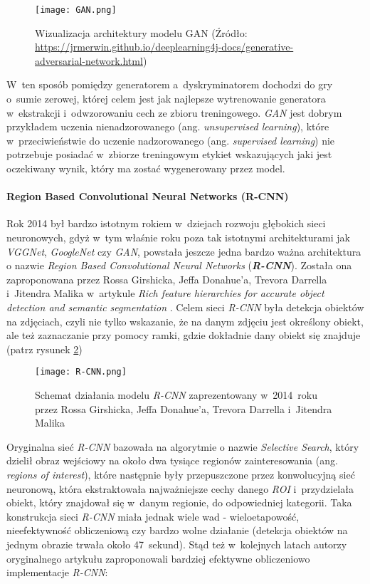 \begin{figure}[!h]
    \centering \texttt{[image: GAN.png]}
    \captionsetup{format=hang}
    \caption{Wizualizacja architektury modelu GAN (Źródło: \url{https://jrmerwin.github.io/deeplearning4j-docs/generative-adversarial-network.html})}
    \label{fig:gan1}
\end{figure}

W~ten sposób pomiędzy generatorem a~dyskryminatorem dochodzi do gry o~sumie zerowej, której celem jest jak najlepsze wytrenowanie generatora w~ekstrakcji i~odwzorowaniu cech ze zbioru treningowego. \emph{GAN} jest dobrym przykładem uczenia nienadzorowanego (ang. \emph{unsupervised learning}), które w~przeciwieństwie do uczenie nadzorowanego (ang. \emph{supervised learning}) nie potrzebuje posiadać w~zbiorze treningowym etykiet wskazujących jaki jest oczekiwany wynik, który ma zostać wygenerowany przez model. 

\paragraph*{Region Based Convolutional Neural Networks (R-CNN)}

Rok 2014 był bardzo istotnym rokiem w~dziejach rozwoju głębokich sieci neuronowych, gdyż w~tym właśnie roku poza tak istotnymi architekturami jak \emph{VGGNet}, \emph{GoogleNet} czy \emph{GAN}, powstała jeszcze jedna bardzo ważna architektura o nazwie \emph{Region Based Convolutional Neural Networks} (\textbf{\emph{R-CNN}}). Została ona zaproponowana przez Rossa Girshicka, Jeffa Donahue'a, Trevora Darrella i~Jitendra Malika w~artykule \emph{Rich feature hierarchies for accurate object detection and semantic segmentation} \cite{girshick}. Celem sieci \emph{R-CNN} była detekcja obiektów na zdjęciach, czyli nie tylko wskazanie, że na danym zdjęciu jest określony obiekt, ale też zaznaczanie przy pomocy ramki, gdzie dokładnie dany obiekt się znajduje (patrz rysunek \ref{fig:rcnn1})

\begin{figure}[!h]
    \centering \texttt{[image: R-CNN.png]}
    \captionsetup{format=hang}
    \caption{Schemat działania modelu \emph{R-CNN} zaprezentowany w~2014~roku przez Rossa Girshicka, Jeffa Donahue'a, Trevora Darrella i~Jitendra Malika \cite{girshick}}
    \label{fig:rcnn1}
\end{figure}

Oryginalna sieć \emph{R-CNN} bazowała na algorytmie o nazwie \emph{Selective Search}, który dzielił obraz wejściowy na około dwa tysiące regionów zainteresowania (ang. \emph{regions of interest}), które następnie były przepuszczone przez konwolucyjną sieć neuronową, która ekstraktowała najważniejsze cechy danego \emph{ROI} i~przydzielała obiekt, który znajdował się w~danym regionie, do odpowiedniej kategorii. Taka konstrukcja sieci \emph{R-CNN} miała jednak wiele wad - wieloetapowość, nieefektywność obliczeniową czy bardzo wolne działanie (detekcja obiektów na jednym obrazie trwała około 47~sekund). Stąd też w~kolejnych latach autorzy oryginalnego artykułu zaproponowali bardziej efektywne obliczeniowo implementacje \emph{R-CNN}:

